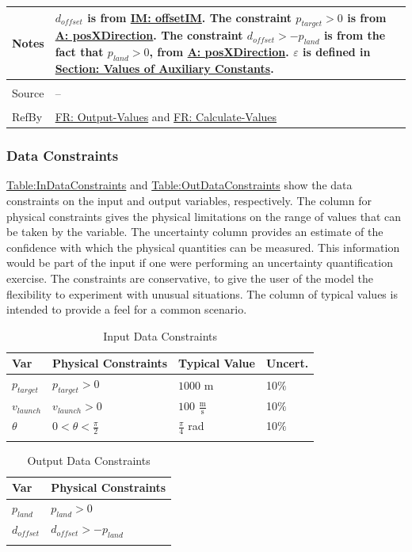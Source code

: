 \documentclass[12pt]{article}
\begin{document}
\begin{minipage}{\textwidth}
\begin{tabular}{>{\raggedright}p{}>{\raggedright\arraybackslash}p{}}
Notes & ${d_{offset}}$ is from \hyperref[IM:offsetIM]{IM: offsetIM}.
        The constraint ${p_{target}}>0$ is from \hyperref[posXDirection]{A: posXDirection}.
        The constraint ${d_{offset}}>-{p_{land}}$ is from the fact that ${p_{land}}>0$, from \hyperref[posXDirection]{A: posXDirection}.
        $ε$ is defined in \hyperref[Sec:AuxConstants]{Section: Values of Auxiliary Constants}.
\\ \midrule \\
Source & --
\\ \midrule \\
RefBy & \hyperref[outputValues]{FR: Output-Values} and \hyperref[calcValues]{FR: Calculate-Values}
\\ \bottomrule \end{tabular}
\end{minipage}
\subsubsection{Data Constraints}
\label{Sec:DataConstraints}
\hyperref[Table:InDataConstraints]{Table:InDataConstraints} and \hyperref[Table:OutDataConstraints]{Table:OutDataConstraints} show the data constraints on the input and output variables, respectively. The column for physical constraints gives the physical limitations on the range of values that can be taken by the variable. The uncertainty column provides an estimate of the confidence with which the physical quantities can be measured. This information would be part of the input if one were performing an uncertainty quantification exercise. The constraints are conservative, to give the user of the model the flexibility to experiment with unusual situations. The column of typical values is intended to provide a feel for a common scenario.
\begin{longtable}{l l l l}
\toprule
\textbf{Var} & \textbf{Physical Constraints} & \textbf{Typical Value} & \textbf{Uncert.}
\\
\midrule
\endhead
${p_{target}}$ & ${p_{target}}>0$ & $1000$ m & 10$\%$
\\
${v_{launch}}$ & ${v_{launch}}>0$ & $100$ $\frac{\text{m}}{\text{s}}$ & 10$\%$
\\
$θ$ & $0<θ<\frac{π}{2}$ & $\frac{π}{4}$ rad & 10$\%$
\\
\bottomrule
\caption{Input Data Constraints}
\label{Table:InDataConstraints}
\end{longtable}
\begin{longtable}{l l}
\toprule
\textbf{Var} & \textbf{Physical Constraints}
\\
\midrule
\endhead
${p_{land}}$ & ${p_{land}}>0$
\\
${d_{offset}}$ & ${d_{offset}}>-{p_{land}}$
\\
\bottomrule
\caption{Output Data Constraints}
\label{Table:OutDataConstraints}
\end{longtable}
\end{document}
